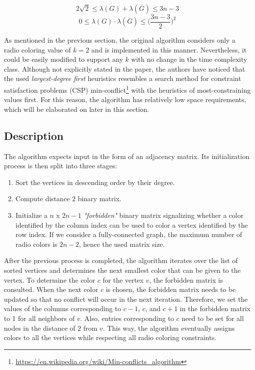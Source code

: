 \documentclass[11pt,a4paper]{article}
\begin{document}
$$ 2 \sqrt{2} \leq \lambda(G) + \lambda(\overline{G}) \leq 3n - 3$$
$$ 0 \leq \lambda(G) \cdot \lambda(\overline{G}) \leq \bigg(\frac{3n-3}{2}\bigg)^2$$

As mentioned in the previous section, the original algorithm considers only a radio coloring value of $k=2$ and is implemented in this manner. Nevertheless, it could be easily modified to support any $k$ with no change in the time complexity class. Although not explicitly stated in the paper, the authors have noticed that the used \emph{largest-degree first} heuristics resembles a search method for constraint satisfaction problems (CSP) min-conflict\footnote{\url{https://en.wikipedia.org/wiki/Min-conflicts_algorithm}} with the heuristics of most-constraining values first. For this reason, the algorithm has relatively low space requirements, which will be elaborated on later in this section.

\subsection{Description}
\label{ssec:parallel_description}

The algorithm expects input in the form of an adjacency matrix. Its initialization process is then split into three stages:

\begin{enumerate}
   \item Sort the vertices in descending order by their degree.
   \item Compute distance 2 binary matrix.
   \item Initialize a $n$ x $2n - 1$ \emph{"forbidden"} binary matrix signalizing whether a color identified by the column index can be used to color a vertex identified by the row index. If we consider a fully-connected graph, the maximum number of radio colors is $2n - 2$, hence the used matrix size.
\end{enumerate}

After the previous process is completed, the algorithm iterates over the list of sorted vertices and determines the next smallest color that can be given to the vertex. To determine the color $c$ for the vertex $v$, the forbidden matrix is consulted. When the next color $c$ is chosen, the forbidden matrix needs to be updated so that no conflict will occur in the next iteration. Therefore, we set the values of the columns corresponding to $c-1$, $c$, and $c+1$ in the forbidden matrix to 1 for all neighbors of $v$. Also, entries corresponding to $c$ need to be set for all nodes in the distance of $2$ from $v$. This way, the algorithm eventually assigns colors to all the vertices while respecting all radio coloring constraints.
\end{document}

